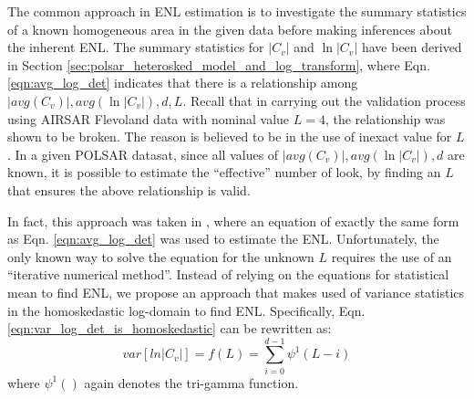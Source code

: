 \documentclass[journal]{IEEEtran}
\begin{document}
The common approach in ENL estimation is to investigate the summary statistics of a known homogeneous area in the given data
  before making inferences about the inherent ENL.
The summary statistics for $|C_v|$ and $\ln|C_v|$ have been derived in Section \ref{sec:polsar_heterosked_model_and_log_transform},
  where Eqn. \ref{eqn:avg_log_det} indicates that there is a relationship among $|avg(C_v)|,avg(\ln|C_v|),d,L$.
Recall that in carrying out the validation process using AIRSAR Flevoland data with nominal value $L=4$, the relationship was shown to be broken.
The reason is believed to be in the use of inexact value for $L$.
In a given POLSAR datasat, since all values of $|avg(C_v)|,avg(\ln|C_v|),d$ are known,
  it is possible to estimate the ``effective'' number of look, by finding an $L$ that ensures the above relationship is valid.

In fact, this approach was taken in \cite{Anfinsen_2009_TGRS_3795},
  where an equation of exactly the same form as Eqn.  \ref{eqn:avg_log_det} was used to estimate the ENL.
Unfortunately, the only known way to solve the equation for the unknown $L$ requires the use of an ``iterative numerical method''.
Instead of relying on the equations for statistical mean to find ENL,
  we propose an approach that makes used of variance statistics in the homoskedastic log-domain to find ENL.
Specifically, Eqn. \ref{eqn:var_log_det_is_homoskedastic} can be rewritten as: 
\begin{equation}
  var \left[ ln|C_v| \right] = f(L) = \sum^{d-1}_{i=0} \psi^1(L-i)
  \label{eqn:expected_sample_var_log_as_function_of_enl}
\end{equation}
where $\psi^1()$ again denotes the tri-gamma function.
\end{document}
